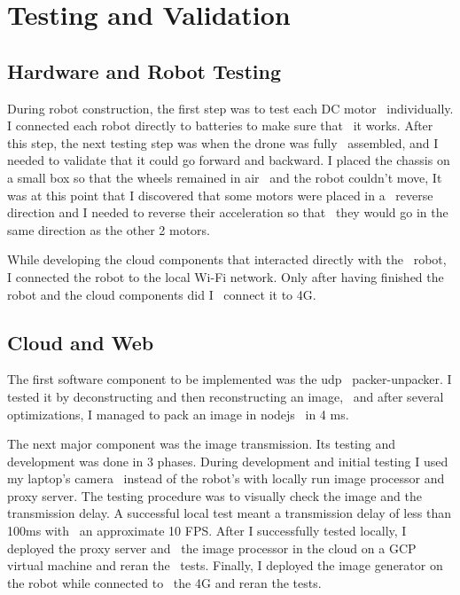 
\chapter{Testing and Validation}
\label{ch:validation}

\section{Hardware and Robot Testing}
\label{sec:validation-hardware}
During robot construction, the first step was to test each DC motor \
individually.
I connected each robot directly to batteries to make sure that \
it works.
After this step, the next testing step was when the drone was fully \
assembled, and I needed to validate that it could go forward and backward.
I placed the chassis on a small box so that the wheels remained in air \
and the robot couldn't move,
It was at this point that I discovered that some motors were placed in a \
reverse direction and I needed to reverse their acceleration so that \
they would go in the same direction as the other 2 motors.

While developing the cloud components that interacted directly with the \
robot, I connected the robot to the local Wi-Fi network.
Only after having finished the robot and the cloud components did I \
connect it to 4G.

\section{Cloud and Web}
\label{sec:validation-individual}

The first software component to be implemented was the udp \
packer-unpacker.
I tested it by deconstructing and then reconstructing an image, \
and after several optimizations, I managed to pack an image in nodejs \
in 4 ms.

The next major component was the image transmission.
Its testing and development was done in 3 phases.
During development and initial testing I used my laptop's camera \
instead of the robot's with locally run image processor and proxy server.
The testing procedure was to visually check the image and the transmission delay.
A successful local test meant a transmission delay of less than 100ms with \
an approximate 10 FPS.
After I successfully tested locally, I deployed the proxy server and \
the image processor in the cloud on a GCP virtual machine and reran the \
tests.
Finally, I deployed the image generator on the robot while connected to \
the 4G and reran the tests.

